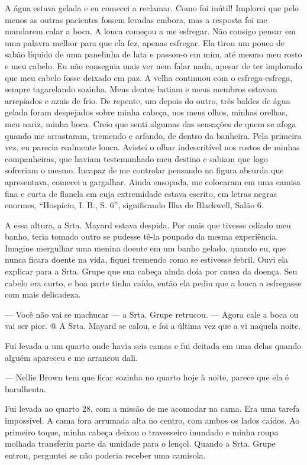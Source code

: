 A
água estava gelada e eu comecei a reclamar. Como foi inútil! Implorei
que pelo menos as outras pacientes fossem levadas embora, mas a resposta
foi me mandarem calar a boca. A louca começou a me esfregar. Não consigo
pensar em uma palavra melhor para que ela fez, apenas esfregar. Ela
tirou um pouco de sabão líquido de uma panelinha de lata e passou-o em
mim, até mesmo meu rosto e meu cabelo. Eu não conseguia mais ver nem
falar nada, apesar de ter implorado que meu cabelo fosse deixado em paz.
A velha continuou com o esfrega-esfrega, sempre tagarelando sozinha.
Meus dentes batiam e meus membros estavam arrepiados e azuis de frio. De
repente, um depois do outro, três baldes de água gelada foram despejados
sobre minha cabeça, nos meus olhos, minhas orelhas, meu nariz, minha
boca. Creio que senti algumas das sensações de quem se afoga quando me
arrastaram, tremendo e arfando, de dentro da banheira. Pela primeira
vez, eu parecia realmente louca. Avistei o olhar indescritível nos
rostos de minhas companheiras, que haviam testemunhado meu destino e
sabiam que logo sofreriam o mesmo. Incapaz de me controlar pensando na
figura absurda que apresentava, comecei a gargalhar. Ainda ensopada, me
colocaram em uma camisa fina e curta de flanela em cuja extremidade
estava escrito, em letras negras enormes, ``Hospício, I. B., S. 6'',
significando Ilha de Blackwell, Salão 6.

A essa altura, a Srta. Mayard estava despida. Por mais que tivesse
odiado meu banho, teria tomado outro se pudesse tê-la poupado da mesma
experiência. Imagine mergulhar uma menina doente em um banho gelado,
quando eu, que nunca ficara doente na vida, fiquei tremendo como se
estivesse febril. Ouvi ela explicar para a Srta. Grupe que sua cabeça
ainda doía por causa da doença. Seu cabelo era curto, e boa parte tinha
caído, então ela pediu que a louca a esfregasse com mais delicadeza.

--- Você não vai se machucar --- a Srta. Grupe retrucou. --- Agora cale
a boca ou vai ser pior. @ A Srta. Mayard se calou, e foi a última vez
que a vi naquela noite.

Fui levada a um quarto onde havia seis camas e fui deitada em uma delas
quando alguém apareceu e me arrancou dali.

--- Nellie Brown tem que ficar sozinha no quarto hoje à noite, parece
que ela é barulhenta.

Fui levada ao quarto 28, com a missão de me acomodar na cama. Era uma
tarefa impossível. A cama fora arrumada alta no centro, com ambos os
lados caídos. Ao primeiro toque, minha cabeça deixou o travesseiro
inundado e minha roupa molhada transferiu parte da umidade para o
lençol. Quando a Srta. Grupe entrou, perguntei se não poderia receber
uma camisola.

